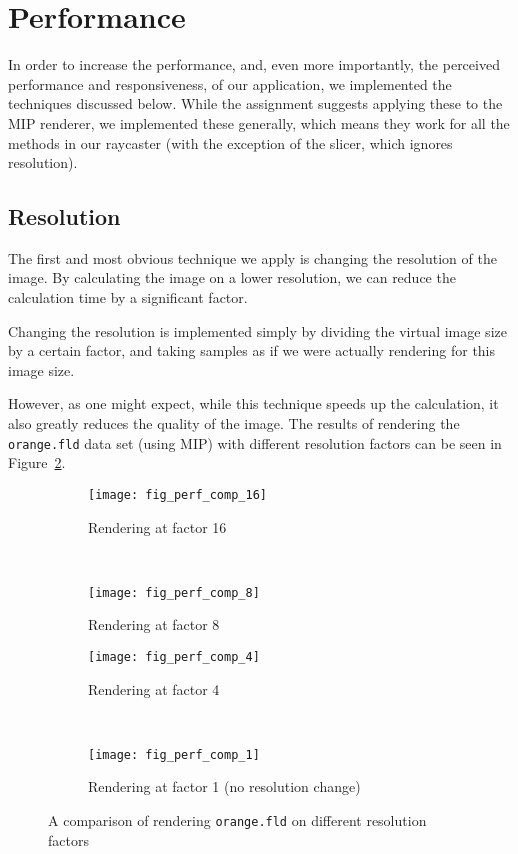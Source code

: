 \section{Performance}
\label{Sec:Perf}

In order to increase the performance, and, even more importantly, the perceived performance and responsiveness, of our application, we implemented the techniques discussed below.
While the assignment suggests applying these to the MIP renderer, we implemented these generally, which means they work for all the methods in our raycaster (with the exception of the slicer, which ignores resolution).

\subsection{Resolution}
The first and most obvious technique we apply is changing the resolution of the image.
By calculating the image on a lower resolution, we can reduce the calculation time by a significant factor.

Changing the resolution is implemented simply by dividing the virtual image size by a certain factor, and taking samples as if we were actually rendering for this image size.

However, as one might expect, while this technique speeds up the calculation, it also greatly reduces the quality of the image.
The results of rendering the \texttt{orange.fld} data set (using MIP) with different resolution factors can be seen in Figure~\ref{fig:perf:comp}.

\begin{figure}[H]
	\centering
	\begin{subfigure}[t]{0.45\textwidth}
		\texttt{[image: fig\_perf\_comp\_16]}
		\caption{Rendering at factor 16}
	\end{subfigure}
	~%
	\begin{subfigure}[t]{0.45\textwidth}
		\texttt{[image: fig\_perf\_comp\_8]}
		\caption{Rendering at factor 8}
	\end{subfigure}
	
	\begin{subfigure}[t]{0.45\textwidth}
		\texttt{[image: fig\_perf\_comp\_4]}
		\caption{Rendering at factor 4}
	\end{subfigure}
	~%
	\begin{subfigure}[t]{0.45\textwidth}
		\texttt{[image: fig\_perf\_comp\_1]}
		\caption{Rendering at factor 1 (no resolution change)}
		\label{fig:perf:comp:1}
	\end{subfigure}
	
	\caption{A comparison of rendering \texttt{orange.fld} on different resolution factors}
	\label{fig:perf:comp}
\end{figure}

